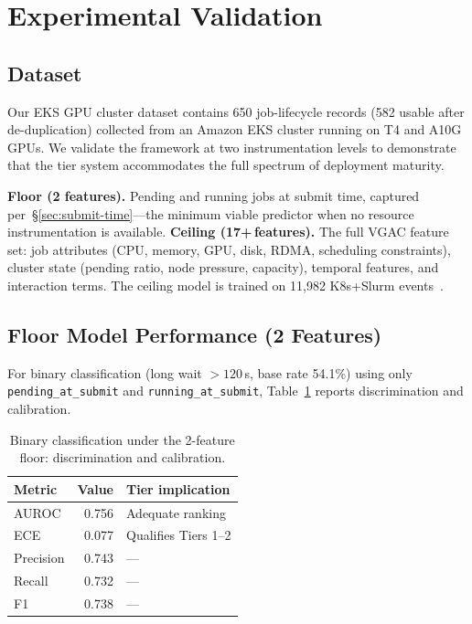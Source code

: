 \documentclass[sigconf]{acmart}
\begin{document}
\section{Experimental Validation}
\label{sec:validation}

\subsection{Dataset}
Our EKS GPU cluster dataset contains 650 job-lifecycle records (582 usable after de-duplication) collected from an Amazon EKS cluster running on T4 and A10G GPUs. We validate the framework at two instrumentation levels to demonstrate that the tier system accommodates the full spectrum of deployment maturity.

\textbf{Floor (2 features).} Pending and running jobs at submit time, captured per~\S\ref{sec:submit-time}---the minimum viable predictor when no resource instrumentation is available.
\textbf{Ceiling (17+\,features).} The full VGAC feature set: job attributes (CPU, memory, GPU, disk, RDMA, scheduling constraints), cluster state (pending ratio, node pressure, capacity), temporal features, and interaction terms. The ceiling model is trained on 11,982 K8s+Slurm events~\cite{espira2026benchmark}.

\subsection{Floor Model Performance (2 Features)}
For binary classification (long wait $> 120$\,s, base rate 54.1\%) using only \texttt{pending\_at\_submit} and \texttt{running\_at\_submit}, Table~\ref{tab:floor} reports discrimination and calibration.

\begin{table}[t]
\centering
\caption{Binary classification under the 2-feature floor: discrimination and calibration.}
\label{tab:floor}
\small
\begin{tabular}{@{}lrl@{}}
\toprule
\textbf{Metric}    & \textbf{Value} & \textbf{Tier implication} \\
\midrule
AUROC              & 0.756 & Adequate ranking \\
ECE                & 0.077 & Qualifies Tiers 1--2 \\
Precision          & 0.743 & --- \\
Recall             & 0.732 & --- \\
F1                 & 0.738 & --- \\
\bottomrule
\end{tabular}
\end{table}
\end{document}

